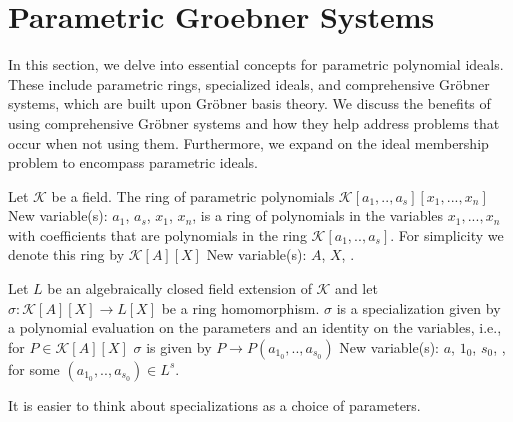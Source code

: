 \documentclass[runningheads]{llncs}
\newcommand{\1}{\chi}
\begin{document}
 \newpage 
\section{Parametric Groebner Systems}
\label{pgs}

In this section, we delve into essential concepts for 
parametric polynomial ideals. These include parametric rings, 
specialized ideals, and comprehensive Gr{\"o}bner systems, which are built upon 
Gr{\"o}bner basis theory. 
We discuss the benefits of using comprehensive Gr{\"o}bner systems 
and how they help address problems that occur when not using them. 
Furthermore, we expand on the ideal membership problem to encompass parametric ideals.



\begin{definition}
    Let \(\mathcal{K}\) be a field. The ring of parametric polynomials
    \(\mathcal{K}[a_1,..,a_s][x_1,...,x_n]\)
{\color{blue} New variable(s): \(a_1\), \(a_s\), \(x_1\), \(x_n\),  }
 is a ring of polynomials in the variables \(x_1,...,x_n\) with coefficients that are polynomials
    in the ring \(\mathcal{K}[a_1,..,a_s]\). 
    For simplicity we denote this ring by \(\mathcal{K}[A][X]\)
{\color{blue} New variable(s): \(A\), \(X\),  }
.
\end{definition}

\begin{definition}
    Let \(L\) be an algebraically closed field extension of \(\mathcal{K}\) and let \(\sigma:\mathcal{K}[A][X]\rightarrow L[X]\) be a ring homomorphism. \(\sigma\) is a specialization given by a polynomial evaluation on the parameters and an identity on the variables, i.e., 
    for \(P\in \mathcal{K}[A][X]\)
    \(\sigma\) is given by \(P\rightarrow P(a_{1_0},..,a_{s_0})\)
{\color{blue} New variable(s): \(a\), \(1_0\), \(s_0\),  }
, for some \((a_{1_0},..,a_{s_0})\in L^s\).
    
\end{definition}
It is easier to think about specializations as a choice of parameters. \\
\end{document}
